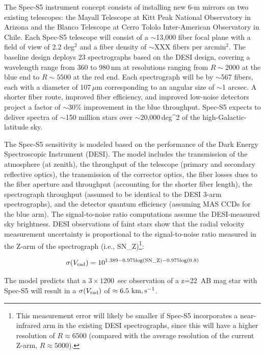The Spec-S5 instrument concept consists of installing new 6-m mirrors on two existing telescopes:  the Mayall Telescope at Kitt Peak National Observatory in Arizona and the Blanco Telescope at Cerro Tololo Inter-American Observatory in Chile.
Each Spec-S5 telescope will consist of a $\sim$13,000 fiber focal plane with a field of view of 2.2 deg$^2$ and a fiber density of $\sim$XXX fibers per arcmin$^2$.
The baseline design deploys 23 spectrographs based on the DESI design, covering a wavelength range from 360 to 980\,nm at resolutions ranging from $R \sim 2000$ at the blue end to $R \sim 5500$ at the red end.
Each spectrograph will be by $\sim$567 fibers, each with a diameter of 107\,$\mu$m corresponding to an angular size of $\sim$1 arcsec.
A shorter fiber route, improved fiber efficiency, and improved low-noise detectors project a factor of $\sim$30\% improvement in the blue throughput.
Spec-S5 expects to deliver spectra of $\sim$150 million stars over $\sim$20,000\,deg^2 of the high-Galactic-latitude sky.

The Spec-S5 sensitivity is modeled based on the performance of the Dark Energy Spectroscopic Instrument (DESI). The model includes the transmission of the atmosphere (at zenith), the throughput of the telescope (primary and secondary reflective optics), the transmission of the corrector optics, the fiber losses dues to the fiber aperture and throughput (accounting for the shorter fiber length), the spectrograph throughput (assumed to be identical to the DESI 3-arm spectrographs), and the detector quantum efficiency (assuming MAS CCDs for the blue arm). The signal-to-noise ratio computations assume the DESI-measured sky brightness. DESI observations of faint stars show that the radial velocity measurement uncertainty is proportional to the signal-to-noise ratio measured in the Z-arm of the spectrograph (i.e., SN\_Z)\footnote{This measurement error will likely be smaller if Spec-S5 incorporates a near-infrared arm in the existing DESI spectrographs, since this will have a higher resolution of $R\approx6500$ (compared with the average resolution of the current Z-arm, $R \approx 5000$).}:

\begin{equation}
\sigma(V_{\rm rad}) = 10^{\rm 1.389 - 0.975log(SN\_Z) - 0.975log(0.8)}
\end{equation}

\noindent The model predicts that a $3 \times 1200$~sec observation of a z=22~AB mag star with Spec-S5 will result in a $\sigma(V_{\rm rad})$ of $\approx 6.5~{\rm km,s^{-1}}$.

